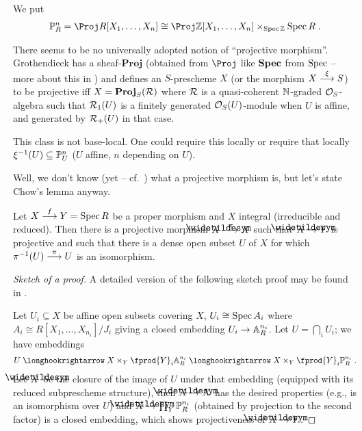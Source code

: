 \documentclass[a4paper,parskip=half,numbers=enddot, DIV=12]{scrreprt}
\begin{document}
\begin{defi}
	We put
    \begin{align*}
        \IP^n_R = \Proj R[X_1,\ldots, X_n]\cong \Proj \IZ[X_1,\ldots,X_n]\times_{\Spec \IZ}\Spec R\;.
    \end{align*}
\end{defi}
\begin{rem}
    There seems to be no universally adopted notion of ``projective morphism''. Grothendieck has a sheaf-$\mathbf{Proj}$ (obtained from $\Proj$ like $\operatorname{\mathbf{Spec}}$ from $\operatorname{Spec}$ -- more about this in \cite[Section~2.3]{alggeo2}) and defines an $S$-prescheme $X$ (or the morphism $X\morphism[\xi] S$) to be projective iff $X= \mathbf{Proj}_S(\mathcal{R})$ where $\mathcal{R}$ is a quasi-coherent $\mathbb{N}$-graded $\mathcal{O}_S$-algebra such that $\mathcal{R}_1(U)$ is a finitely generated $\mathcal{O}_S(U)$-module when $U$ is affine, and generated by $\mathcal{R}_+(U)$ in that case.
    
    This class is not base-local. One could require this locally or require that locally $\xi^{-1}(U) \subseteq \mathbb{P}^n_U$ ($U$ affine, $n$ depending on $U$).
\end{rem}
Well, we don't know (yet -- cf.\ \cite[Definition~2.3.1]{alggeo2}) what a projective morphism is, but let's state Chow's lemma anyway.
\begin{prop}
    Let $X\morphism[f] Y=\Spec R$ be a proper morphism and $X$ integral (irreducible and reduced). Then there is a projective morphism $\snake X\morphism[\pi] X$ such that $\snake X\morphism Y$ is projective and such that there is a dense open subset $U$ of $X$ for which $\pi^{-1}(U) \morphism[\pi] U$ is an isomorphism.
\end{prop}
\begin{proof}[Sketch of a proof] 
	A detailed version of the following sketch proof may be found in \cite[Section~A.3]{alggeo2}.
	
    Let $U_i\subseteq X$ be affine open subsets covering $X$, $U_i\cong \operatorname{Spec} A_i$ where $A_i\cong R[X_1,\ldots, X_{n_i}]/J_i$ giving a closed embedding $U_i\morphism \IA^{n_i}_R$. Let $U = \bigcap_i U_i$; we have embeddings 
    \begin{align*}
        U\monomorphism X\times_Y \fprod{Y}_i \IA^{n_i}_R\monomorphism X\times_Y\fprod{Y}_i \IP^{n_i}_R\;.
    \end{align*}
    Let $\snake X$ be the closure of the image of $U$ under that embedding (equipped with its reduced subprescheme structure), then $\snake X\morphism X$ has the desired properties (e.g., is an isomorphism over $U$) and $\snake X\morphism \prod_{Y}\IP^{n_i}_R$ (obtained by projection to the second factor) is a closed embedding, which shows projectiveness of $\snake{X}\morphism Y$.
\end{proof}
\end{document}
